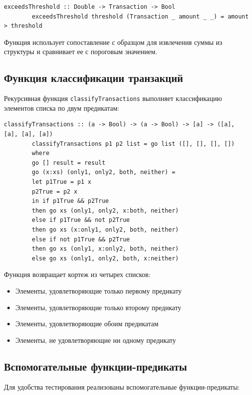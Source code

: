 \documentclass[a4paper, final]{article}
\begin{document}
	\begin{lstlisting}[caption={Функция проверки порогового значения}, label={lst:threshold}]
		exceedsThreshold :: Double -> Transaction -> Bool
		exceedsThreshold threshold (Transaction _ amount _ _) = amount > threshold
	\end{lstlisting}
	
	Функция использует сопоставление с образцом для извлечения суммы из структуры и сравнивает ее с пороговым значением.
	
	\subsection{Функция классификации транзакций}
	
	Рекурсивная функция \texttt{classifyTransactions} выполняет классификацию элементов списка по двум предикатам:
	
	\begin{lstlisting}[caption={Функция классификации транзакций}, label={lst:classify}]
		classifyTransactions :: (a -> Bool) -> (a -> Bool) -> [a] -> ([a], [a], [a], [a])
		classifyTransactions p1 p2 list = go list ([], [], [], [])
		where
		go [] result = result
		go (x:xs) (only1, only2, both, neither) =
		let p1True = p1 x
		p2True = p2 x
		in if p1True && p2True
		then go xs (only1, only2, x:both, neither)
		else if p1True && not p2True
		then go xs (x:only1, only2, both, neither)
		else if not p1True && p2True
		then go xs (only1, x:only2, both, neither)
		else go xs (only1, only2, both, x:neither)
	\end{lstlisting}
	
	Функция возвращает кортеж из четырех списков:
	\begin{itemize}
		\item Элементы, удовлетворяющие только первому предикату
		\item Элементы, удовлетворяющие только второму предикату  
		\item Элементы, удовлетворяющие обоим предикатам
		\item Элементы, не удовлетворяющие ни одному предикату
	\end{itemize}
	
	\subsection{Вспомогательные функции-предикаты}
	
	Для удобства тестирования реализованы вспомогательные функции-предикаты:
	
\end{document}
